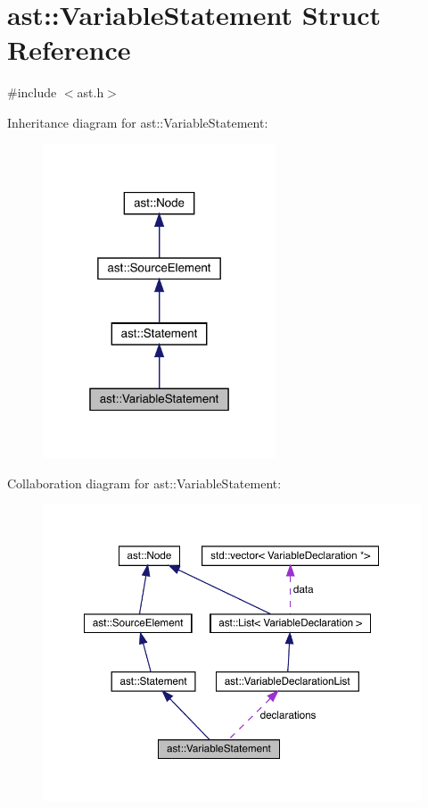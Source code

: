 \hypertarget{structast_1_1_variable_statement}{}\section{ast\+:\+:Variable\+Statement Struct Reference}
\label{structast_1_1_variable_statement}


{\ttfamily \#include $<$ast.\+h$>$}



Inheritance diagram for ast\+:\+:Variable\+Statement\+:\nopagebreak
\begin{figure}[H]
\begin{center}
\leavevmode
\includegraphics[width=196pt]{structast_1_1_variable_statement__inherit__graph}
\end{center}
\end{figure}


Collaboration diagram for ast\+:\+:Variable\+Statement\+:\nopagebreak
\begin{figure}[H]
\begin{center}
\leavevmode
\includegraphics[width=350pt]{structast_1_1_variable_statement__coll__graph}
\end{center}
\end{figure}
